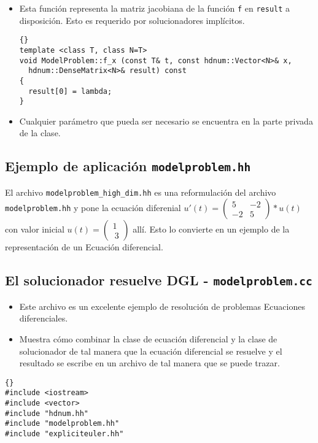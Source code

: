 \documentclass[a4paper,11pt]{article}
\theoremstyle{definition}
\begin{document}
\begin{itemize}
\item Esta función representa la matriz jacobiana de la función
  \lstinline{f} en \lstinline{result} a disposición. Esto es requerido por solucionadores implícitos.

{\footnotesize{\begin{lstlisting}{}
template <class T, class N=T>
void ModelProblem::f_x (const T& t, const hdnum::Vector<N>& x,
  hdnum::DenseMatrix<N>& result) const
{
  result[0] = lambda;
}
\end{lstlisting}}}

\item Cualquier parámetro que pueda ser necesario se encuentra en la parte privada de la clase.

\end{itemize}


\subsection{Ejemplo de aplicación \lstinline{modelproblem.hh}}
El archivo \lstinline{modelproblem_high_dim.hh} es una reformulación
del archivo \lstinline{modelproblem.hh} y pone la
ecuación diferenial $u'(t) = \begin{pmatrix}
  5 & -2\\
  -2 & 5
\end{pmatrix}*u(t)$ con valor inicial
$ u(t) = \left( \begin{array}{c}1 \\\ 3 \end{array}\right)$ allí. Esto lo convierte en un ejemplo de la representación de un Ecuación diferencial.

\subsection{El solucionador resuelve DGL - \lstinline{modelproblem.cc}}
\begin{itemize}
\item Este archivo es un excelente ejemplo de resolución de problemas
   Ecuaciones diferenciales.
\item Muestra cómo combinar la clase de ecuación diferencial y la clase de solucionador de tal manera que la ecuación diferencial se resuelve y el resultado se escribe en un archivo de tal manera que se puede trazar.
\end{itemize}

{\footnotesize{\begin{lstlisting}{}
#include <iostream>
#include <vector>
#include "hdnum.hh"
#include "modelproblem.hh"
#include "expliciteuler.hh"
\end{lstlisting}}}
\end{document}
